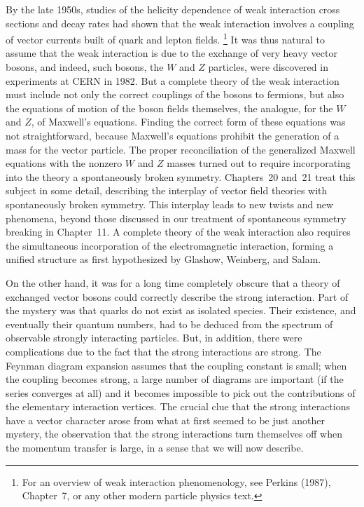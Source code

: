 By the late 1950s, studies of the helicity dependence of weak interaction
cross sections and decay rates had shown that the weak interaction involves a
coupling of vector currents built of quark and lepton fields.%
\footnote{For an overview of weak interaction phenomenology, see Perkins
(1987), Chapter~7, or any other modern particle physics text.}  It was thus
natural to assume that the weak interaction is due to the exchange of very
heavy vector bosons, and indeed, such bosons, the $W$ and $Z$ particles, were
discovered in experiments at CERN in 1982.  But a complete theory of the weak
interaction must include not only the correct couplings of the bosons to
fermions, but also the equations of motion of the boson fields themselves, the
analogue, for the $W$ and $Z$, of Maxwell's equations.  Finding the correct
form of these equations was not straightforward, because Maxwell's equations
prohibit the generation of a mass for the vector particle.  The proper
reconciliation of the generalized Maxwell equations with the nonzero $W$ and
$Z$ masses turned out to require incorporating into the theory a
spontaneously broken symmetry.  Chapters~20 and~21 treat this subject in
some detail, describing the interplay of vector field theories with
spontaneously broken symmetry.  This interplay leads to new twists and new
phenomena, beyond those discussed in our treatment of spontaneous symmetry
breaking in Chapter~11.  A complete theory of the weak interaction also
requires the simultaneous incorporation of the electromagnetic interaction,
forming a unified structure as first hypothesized by Glashow, Weinberg, and
Salam.

On the other hand, it was for a long time completely obscure that a theory of
exchanged vector bosons could correctly describe the strong interaction.
Part of the mystery was that quarks do not exist as isolated species.  Their
existence, and eventually their quantum numbers, had to be deduced from the
spectrum of observable strongly interacting particles.  But, in addition,
there were complications due to the fact that the strong interactions are
strong.  The Feynman diagram expansion assumes that the coupling constant is
small; when the coupling becomes strong, a large number of diagrams are
important (if the series converges at all) and it becomes impossible to pick
out the contributions of the elementary interaction vertices.  The crucial
clue that the strong interactions have a vector character arose from what at
first seemed to be just another mystery, the observation that the strong
interactions turn themselves off when the momentum transfer is large, in a
sense that we will now describe.

